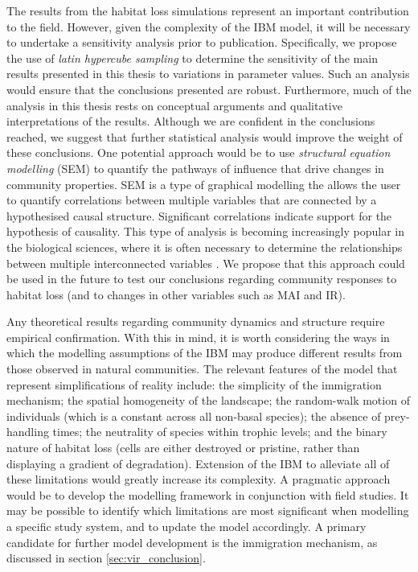 The results from the habitat loss simulations represent an important contribution to the field. However, given the complexity of the IBM model, it will be necessary to undertake a sensitivity analysis prior to publication. Specifically, we propose the use of \emph{latin hypercube sampling} \cite{helton2003latin} to determine the sensitivity of the main results presented in this thesis to variations in parameter values. Such an analysis would ensure that the conclusions presented are robust. Furthermore, much of the analysis in this thesis rests on conceptual arguments and qualitative interpretations of the results. Although we are confident in the conclusions reached, we suggest that further statistical analysis would improve the weight of these conclusions. One potential approach would be to use \emph{structural equation modelling} (SEM) to quantify the pathways of influence that drive changes in community properties. SEM is a type of graphical modelling the allows the user to quantify correlations between multiple variables that are connected by a hypothesised causal structure. Significant correlations indicate support for the hypothesis of causality. This type of analysis is becoming increasingly popular in the biological sciences, where it is often necessary to determine the relationships between multiple interconnected variables \cite{lefcheck2015piecewisesem,yvon2015five}. We propose that this approach could be used in the future to test our conclusions regarding community responses to habitat loss (and to changes in other variables such as MAI and IR).

Any theoretical results regarding community dynamics and structure require empirical confirmation. With this in mind, it is worth considering the ways in which the modelling assumptions of the IBM may produce different results from those observed in natural communities. The relevant features of the model that represent simplifications of reality include: the simplicity of the immigration mechanism; the spatial homogeneity of the landscape; the random-walk motion of individuals (which is a constant across all non-basal species); the absence of prey-handling times; the neutrality of species within trophic levels; and the binary nature of habitat loss (cells are either destroyed or pristine, rather than displaying a gradient of degradation). Extension of the IBM to alleviate all of these limitations would greatly increase its complexity. A pragmatic approach would be to develop the modelling framework in conjunction with field studies. It may be possible to identify which limitations are most significant when modelling a specific study system, and to update the model accordingly. A primary candidate for further model development is the immigration mechanism, as discussed in section \ref{sec:vir_conclusion}.

